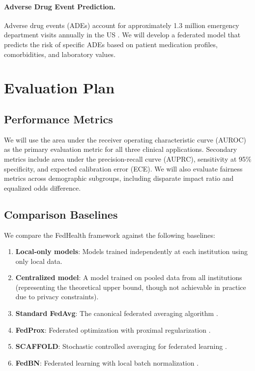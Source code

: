 \documentclass[12pt,letterpaper]{article}
\begin{document}
\paragraph{Adverse Drug Event Prediction.} Adverse drug events (ADEs) account for approximately 1.3 million emergency department visits annually in the US \citep{CDC2018}. We will develop a federated model that predicts the risk of specific ADEs based on patient medication profiles, comorbidities, and laboratory values.

\section{Evaluation Plan}
\label{sec:evaluation}

\subsection{Performance Metrics}

We will use the area under the receiver operating characteristic curve (AUROC) as the primary evaluation metric for all three clinical applications. Secondary metrics include area under the precision-recall curve (AUPRC), sensitivity at 95\% specificity, and expected calibration error (ECE). We will also evaluate fairness metrics across demographic subgroups, including disparate impact ratio and equalized odds difference.

\subsection{Comparison Baselines}

We compare the FedHealth framework against the following baselines:
\begin{enumerate}[label=(\roman*)]
  \item \textbf{Local-only models}: Models trained independently at each institution using only local data.
  \item \textbf{Centralized model}: A model trained on pooled data from all institutions (representing the theoretical upper bound, though not achievable in practice due to privacy constraints).
  \item \textbf{Standard FedAvg}: The canonical federated averaging algorithm \citep{McMahan2017}.
  \item \textbf{FedProx}: Federated optimization with proximal regularization \citep{Li2020fedprox}.
  \item \textbf{SCAFFOLD}: Stochastic controlled averaging for federated learning \citep{Karimireddy2020}.
  \item \textbf{FedBN}: Federated learning with local batch normalization \citep{Li2021fedbn}.
\end{enumerate}
\end{document}
